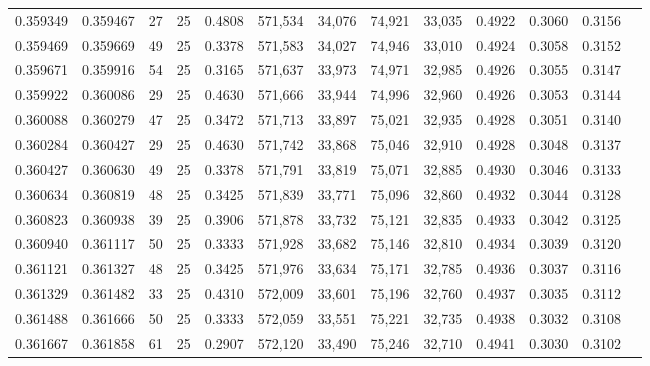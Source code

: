 \begin{tabular}{rrrrrrrrrrrrr}
0.359349 & 0.359467 &    27 &  25 &                                     0.4808 & 571,534 &  34,076 &  74,921 &  33,035 & 0.4922 & 0.3060 & 0.3156 \\
0.359469 & 0.359669 &    49 &  25 &                                     0.3378 & 571,583 &  34,027 &  74,946 &  33,010 & 0.4924 & 0.3058 & 0.3152 \\
0.359671 & 0.359916 &    54 &  25 &                                     0.3165 & 571,637 &  33,973 &  74,971 &  32,985 & 0.4926 & 0.3055 & 0.3147 \\
0.359922 & 0.360086 &    29 &  25 &                                     0.4630 & 571,666 &  33,944 &  74,996 &  32,960 & 0.4926 & 0.3053 & 0.3144 \\
0.360088 & 0.360279 &    47 &  25 &                                     0.3472 & 571,713 &  33,897 &  75,021 &  32,935 & 0.4928 & 0.3051 & 0.3140 \\
0.360284 & 0.360427 &    29 &  25 &                                     0.4630 & 571,742 &  33,868 &  75,046 &  32,910 & 0.4928 & 0.3048 & 0.3137 \\
0.360427 & 0.360630 &    49 &  25 &                                     0.3378 & 571,791 &  33,819 &  75,071 &  32,885 & 0.4930 & 0.3046 & 0.3133 \\
0.360634 & 0.360819 &    48 &  25 &                                     0.3425 & 571,839 &  33,771 &  75,096 &  32,860 & 0.4932 & 0.3044 & 0.3128 \\
0.360823 & 0.360938 &    39 &  25 &                                     0.3906 & 571,878 &  33,732 &  75,121 &  32,835 & 0.4933 & 0.3042 & 0.3125 \\
0.360940 & 0.361117 &    50 &  25 &                                     0.3333 & 571,928 &  33,682 &  75,146 &  32,810 & 0.4934 & 0.3039 & 0.3120 \\
0.361121 & 0.361327 &    48 &  25 &                                     0.3425 & 571,976 &  33,634 &  75,171 &  32,785 & 0.4936 & 0.3037 & 0.3116 \\
0.361329 & 0.361482 &    33 &  25 &                                     0.4310 & 572,009 &  33,601 &  75,196 &  32,760 & 0.4937 & 0.3035 & 0.3112 \\
0.361488 & 0.361666 &    50 &  25 &                                     0.3333 & 572,059 &  33,551 &  75,221 &  32,735 & 0.4938 & 0.3032 & 0.3108 \\
0.361667 & 0.361858 &    61 &  25 &                                     0.2907 & 572,120 &  33,490 &  75,246 &  32,710 & 0.4941 & 0.3030 & 0.3102 \\

\end{tabular}
